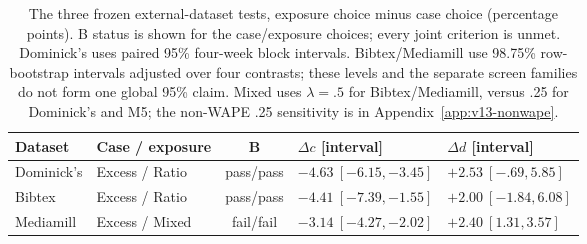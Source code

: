 \begin{table}[t]\centering\small
\caption{The three frozen external-dataset tests, exposure choice minus case choice (percentage points). B status is shown for the case/exposure choices; every joint criterion is unmet. Dominick's uses paired 95\% four-week block intervals. Bibtex/Mediamill use 98.75\% row-bootstrap intervals adjusted over four contrasts; these levels and the separate screen families do not form one global 95\% claim. Mixed uses $\lambda=.5$ for Bibtex/Mediamill, versus .25 for Dominick's and M5; the non-WAPE .25 sensitivity is in Appendix~\ref{app:v13-nonwape}.}\label{tab:external-v13}
\begin{tabular}{llcll}\toprule
Dataset & Case / exposure & B & $\Delta c$ [interval] & $\Delta d$ [interval]\\\midrule
Dominick's & Excess / Ratio & pass/pass & $-4.63\ [-6.15,-3.45]$ & $+2.53\ [-.69,5.85]$\\
Bibtex & Excess / Ratio & pass/pass & $-4.41\ [-7.39,-1.55]$ & $+2.00\ [-1.84,6.08]$\\
Mediamill & Excess / Mixed & fail/fail & $-3.14\ [-4.27,-2.02]$ & $+2.40\ [1.31,3.57]$\\
\bottomrule\end{tabular}
\end{table}
